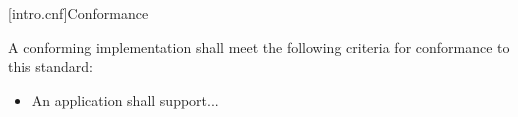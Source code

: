 
[intro.cnf]{Conformance}

\pnum
A conforming implementation shall meet the following criteria for conformance
to this standard:

\begin{itemize}

\item An application shall support...

\end{itemize}